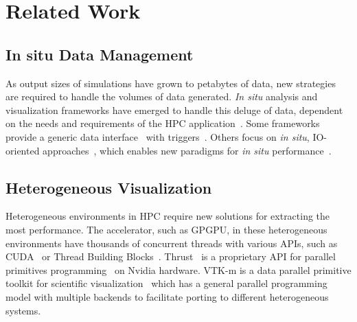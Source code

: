 \section{Related Work}
\subsection{In situ Data Management}
As output sizes of simulations have grown to petabytes of data, new strategies are required to handle the volumes of data generated. \textit{In situ} analysis and visualization frameworks have emerged to handle this deluge of data, dependent on the needs and requirements of the HPC application~\cite{Abbasi2010, Ayachit:2015:PCE:2828612.2828624,Childs:VisIt-HPV-Chapter:2012, 6846460}. Some frameworks provide a generic data interface~\cite{Ayachit:2016:SGS:3018859.3018867,Larsen:2017:ASI:3144769.3144778} with triggers~\cite{Larsen:2018:FSS:3281464.3281468}. Others focus on \textit{in situ}, IO-oriented approaches~\cite{doi:10.1002/cpe.3125}, which enables new paradigms for \textit{in situ} performance~\cite{Kress:ISC19}.

\subsection{Heterogeneous Visualization}
Heterogeneous environments in HPC require new solutions for extracting the most performance. The accelerator, such as GPGPU, in these heterogeneous environments have thousands of concurrent threads with various APIs, such as CUDA~\cite{CUDA} or Thread Building Blocks~\cite{books/daglib/0018624}. Thrust~\cite{hoberock2009thrust} is a proprietary API for parallel primitives programming~\cite{Blelloch:1990:VMD:91254} on Nvidia hardware. VTK-m is a data parallel primitive toolkit for scientific visualization~\cite{vtkm} which has a general parallel programming model with multiple backends to facilitate porting to different heterogeneous systems. 

